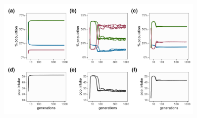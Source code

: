\documentclass[11pt]{article}
\begin{document}
\begin{figure}[h!]
    \centering
    \includegraphics[width=0.90\textwidth]{figures/fig_02_strategy_generations.png}
    \caption{}
    \label{Fig:NodeWeightEvol}
\end{figure}




\renewcommand{\figurename}{Video} 
\setcounter{figure}{0}


\renewcommand{\figurename}{Figure}
\setcounter{figure}{1}



\end{document}
